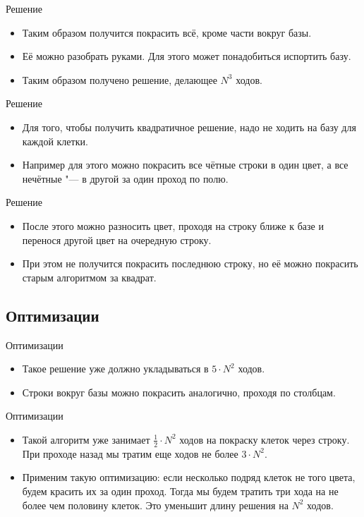 \begin{frame}[t]{Решение}
  \begin{itemize}
    \item Таким образом получится покрасить всё, кроме части вокруг базы.
    \item Её можно разобрать руками. Для этого может понадобиться испортить базу.
    \item Таким образом получено решение, делающее $N^3$ ходов.
  \end{itemize}
\end{frame}

\begin{frame}[t]{Решение}
  \begin{itemize}
    \item Для того, чтобы получить квадратичное решение, надо не ходить на базу для каждой клетки.
    \item Например для этого можно покрасить все чётные строки в один цвет, а все нечётные "--- в другой за один проход по полю.
  \end{itemize}
\end{frame}

\begin{frame}[t]{Решение}
  \begin{itemize}
    \item После этого можно разносить цвет, проходя на строку ближе к базе и перенося другой цвет на очередную строку.
    \item При этом не получится покрасить последнюю строку, но её можно покрасить старым алгоритмом за квадрат.
  \end{itemize}
\end{frame}

\subsection{Оптимизации}

\begin{frame}[t]{Оптимизации}
    \begin{itemize}
        \item Такое решение уже должно укладываться в $5\cdot N^2$ ходов.
        \item Строки вокруг базы можно покрасить аналогично, проходя по столбцам.
    \end{itemize}
\end{frame}

\begin{frame}[t]{Оптимизации}
    \begin{itemize}
        \item Такой алгоритм уже занимает $\frac{1}{2} \cdot N^2$ ходов на покраску клеток через строку. При проходе назад
            мы тратим еще ходов не более $3 \cdot N^2$.
        \item Применим такую оптимизацию: если несколько подряд клеток не того цвета, будем красить их за один проход.
            Тогда мы будем тратить три хода на не более чем половину клеток. Это уменьшит длину решения на $N^2$ ходов.
    \end{itemize}
\end{frame}

